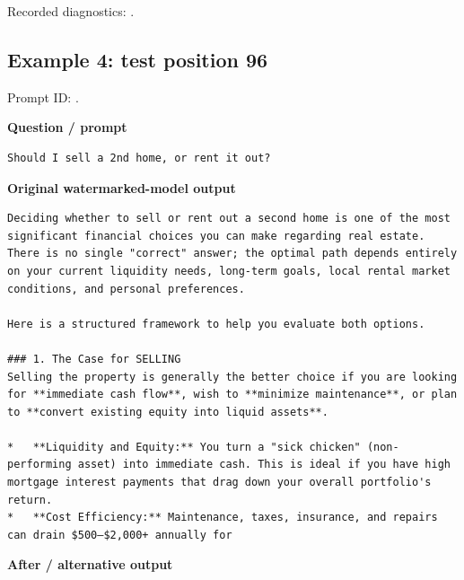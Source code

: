 Recorded diagnostics:
\texttt{}.

\subsection{Example 4: test position
96}\label{record-docs-watermarking-qualitative-text-textseal2-vanilla-md-example-4-test-position-96}

Prompt ID:
\texttt{}.

\textbf{Question / prompt}

\begin{Verbatim}
Should I sell a 2nd home, or rent it out?
\end{Verbatim}

\textbf{Original watermarked-model output}

\begin{Verbatim}
Deciding whether to sell or rent out a second home is one of the most significant financial choices you can make regarding real estate. There is no single "correct" answer; the optimal path depends entirely on your current liquidity needs, long-term goals, local rental market conditions, and personal preferences.

Here is a structured framework to help you evaluate both options.

### 1. The Case for SELLING
Selling the property is generally the better choice if you are looking for **immediate cash flow**, wish to **minimize maintenance**, or plan to **convert existing equity into liquid assets**.

*   **Liquidity and Equity:** You turn a "sick chicken" (non-performing asset) into immediate cash. This is ideal if you have high mortgage interest payments that drag down your overall portfolio's return.
*   **Cost Efficiency:** Maintenance, taxes, insurance, and repairs can drain $500–$2,000+ annually for
\end{Verbatim}

\textbf{After / alternative output}


